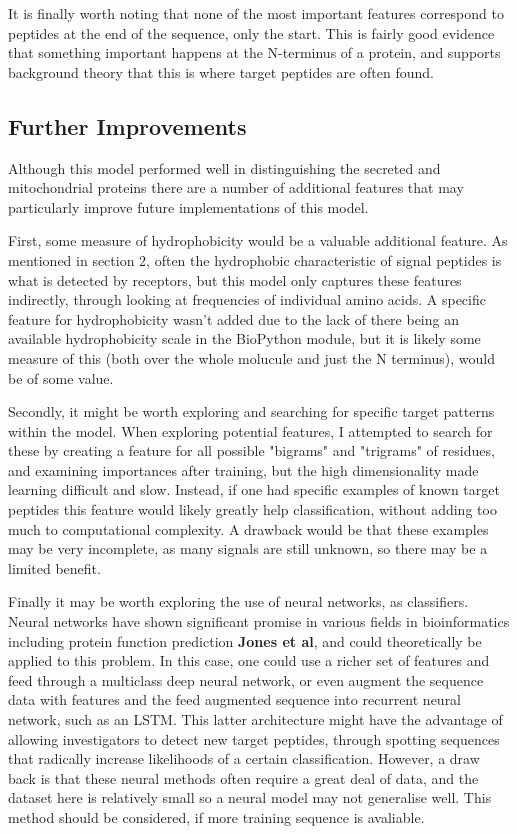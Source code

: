 \documentclass{bioinfo}
\begin{document}
It is finally worth noting that none of the most important features correspond to peptides at the end of the sequence, only the start.  This is fairly good evidence that something important happens at the N-terminus of a protein, and supports background theory that this is where target peptides are often found.


\subsection{Further Improvements}

Although this model performed well in distinguishing the secreted and mitochondrial proteins there are a number of additional features that may particularly improve future implementations of this model. 

First, some measure of hydrophobicity would be a valuable additional feature. 
As mentioned in section 2, often the hydrophobic characteristic of signal peptides is what is detected by receptors, but this model only captures these features indirectly, through looking at frequencies of individual amino acids.
A specific feature for hydrophobicity wasn't added due to the lack of there being an available hydrophobicity scale in the BioPython module, but it is likely some measure of this (both over the whole molucule and just the N terminus), would be of some value.

Secondly, it might be worth exploring and searching for specific target patterns within the model. 
When exploring potential features, I attempted to search for these by creating a feature for all possible "bigrams" and "trigrams" of residues, and examining importances after training, but the high dimensionality made learning difficult and slow. 
Instead, if one had specific examples of known target peptides this feature would likely greatly help classification, without adding too much to computational complexity.
A drawback would be that these examples may be very incomplete, as many signals are still unknown, so there may be a limited benefit.

Finally it may be worth exploring the use of neural networks, as classifiers.
Neural networks have shown significant promise in various fields in bioinformatics including protein function prediction \textbf{Jones et al}, and could theoretically be applied to this problem. 
In this case, one could use a richer set of features and feed through a multiclass deep neural network, or even augment the sequence data with features and the feed augmented sequence into recurrent neural network, such as an LSTM. 
This latter architecture might have the advantage of allowing investigators to detect new target peptides, through spotting sequences that radically increase likelihoods of a certain classification.
However, a draw back is that these neural methods often require a great deal of data, and the dataset here is relatively small so a neural model may not generalise well.
This method should be considered, if more training sequence is avaliable.
\end{document}
